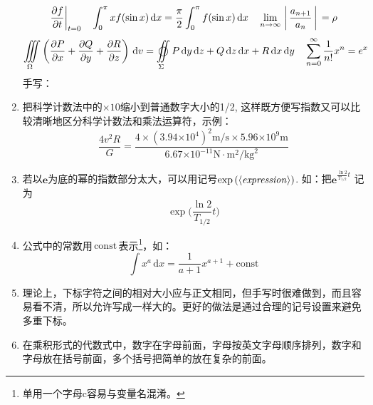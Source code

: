 \documentclass[11pt, a4paper, titlepage]{article}
\newcommand{\diff}{\,\mathrm{d}} %
\begin{document}
\begin{enumerate}
\begin{displaymath}
        \left. \frac{\partial f}{\partial t} \right|_{t=0} \quad
        \int_0^{\pi} x f(\sin x) \diff x = \frac{\pi}{2} \int_0^{\pi} f(\sin x) \diff x \quad
        \lim_{n \to \infty}\bigg\arrowvert \frac{a_{n+1}}{a_{n}} \bigg\arrowvert = \rho
    \end{displaymath}
    \begin{displaymath}
        \iiint\limits_\Omega \left(\frac{\partial P}{\partial x} + \frac{\partial Q}{\partial y} + \frac{\partial R}{\partial z} \right) \diff v = \varoiint\limits_\Sigma P\diff y \diff z + Q\diff z \diff x + R\diff x \diff y \quad %
        \sum_{n=0}^\infty \frac{1}{n!} x^{n} = e^{x}
    \end{displaymath}
    手写：\\[60pt]

\item 把科学计数法中的$\scriptstyle\times10$缩小到普通数字大小的1/2, 这样既方便写指数又可以比较清晰地区分科学计数法和乘法运算符，示例：
    \begin{displaymath}
        \frac{4v^{2}R}{G} = \frac{4 \times (3.94{\scriptstyle\times10}^{4})^{2}\mathrm{m}/\mathrm{s} \times 5.96{\scriptstyle\times10}^{9}\mathrm{m}}{6.67{\scriptstyle\times10}^{-11}\mathrm{N}\cdot \mathrm{m}^{2}/\mathrm{kg}^{2}}
    \end{displaymath}

\item \label{brace}若以$\mathbf{e}$为底的幂的指数部分太大，可以用记号$\exp\left(\langle\text{\emph{expression}}\rangle\right)$. 如：把$\mathbf{e}^{\frac{\ln2}{T_{1/2}}t}$ 记为
    \begin{displaymath}
        \exp\biggl( \frac{\ln2}{T_{1/2}}t \biggr)
    \end{displaymath}

\item 公式中的常数用$\, \mathrm{const}\,$表示\footnote{单用一个字母c容易与变量名混淆。}，如：
    \begin{displaymath}
        \int x^{a}\diff x = \frac{1}{a+1} x^{a+1} + \mathrm{const}
    \end{displaymath}

\item 理论上，下标字符之间的相对大小应与正文相同，但手写时很难做到，而且容易看不清，所以允许写成一样大的。更好的做法是通过合理的记号设置来避免多重下标。

\item 在乘积形式的代数式中，数字在字母前面，字母按英文字母顺序排列，数字和字母放在括号前面，多个括号把简单的放在复杂的前面。


\end{enumerate}
\end{document}
